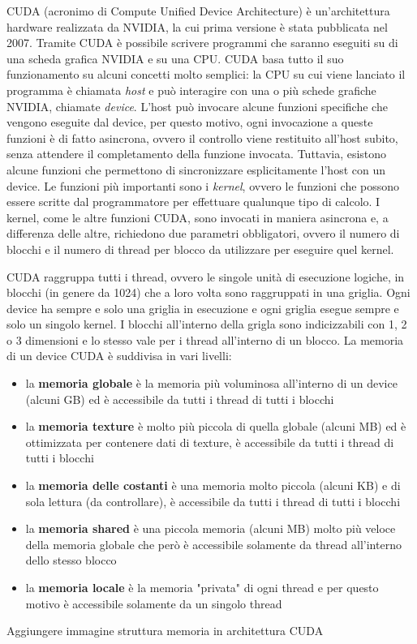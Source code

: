 \documentclass[a4paper]{article}
\begin{document}
	CUDA (acronimo di Compute Unified Device Architecture) è un'architettura hardware realizzata da NVIDIA, la cui prima versione è stata pubblicata nel 2007. Tramite CUDA è possibile scrivere programmi che saranno eseguiti su di una scheda grafica NVIDIA e su una CPU. CUDA basa tutto il suo funzionamento su alcuni concetti molto semplici: la CPU su cui viene lanciato il programma è chiamata \textit{host} e può interagire con una o più schede grafiche NVIDIA, chiamate \textit{device}. L'host può invocare alcune funzioni specifiche che vengono eseguite dal device, per questo motivo, ogni invocazione a queste funzioni è di fatto asincrona, ovvero il controllo viene restituito all'host subito, senza attendere il completamento della funzione invocata. Tuttavia, esistono alcune funzioni che permettono di sincronizzare esplicitamente l'host con un device. Le funzioni più importanti sono i \textit{kernel}, ovvero le funzioni che possono essere scritte dal programmatore per effettuare qualunque tipo di calcolo. I kernel, come le altre funzioni CUDA, sono invocati in maniera asincrona e, a differenza delle altre, richiedono due parametri obbligatori, ovvero il numero di blocchi e il numero di thread per blocco da utilizzare per eseguire quel kernel.
	
	CUDA raggruppa tutti i thread, ovvero le singole unità di esecuzione logiche, in blocchi (in genere da 1024) che a loro volta sono raggruppati in una griglia. Ogni device ha sempre e solo una griglia in esecuzione e ogni griglia esegue sempre e solo un singolo kernel. I blocchi all'interno della grigla sono indicizzabili con 1, 2 o 3 dimensioni e lo stesso vale per i thread all'interno di un blocco. La memoria di un device CUDA è suddivisa in vari livelli:
	\begin{itemize}
		\item la \textbf{memoria globale} è la memoria più voluminosa all'interno di un device (alcuni GB) ed è accessibile da tutti i thread di tutti i blocchi
		\item la \textbf{memoria texture} è molto più piccola di quella globale (alcuni MB) ed è ottimizzata per contenere dati di texture, è accessibile da tutti i thread di tutti i blocchi
		\item la \textbf{memoria delle costanti} è una memoria molto piccola (alcuni KB) e di sola lettura (da controllare), è accessibile da tutti i thread di tutti i blocchi
		\item la \textbf{memoria shared} è una piccola memoria (alcuni MB) molto più veloce della memoria globale che però è accessibile solamente da thread all'interno dello stesso blocco
		\item la \textbf{memoria locale} è la memoria "privata" di ogni thread e per questo motivo è accessibile solamente da un singolo thread
	\end{itemize}
	Aggiungere immagine struttura memoria in architettura CUDA
	
\end{document}
